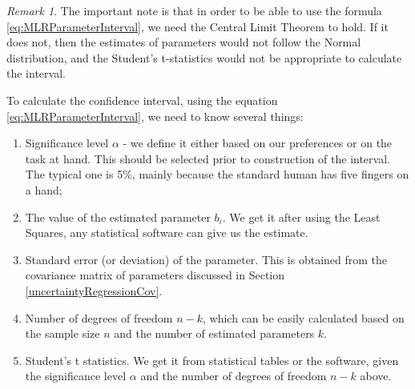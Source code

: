 \documentclass[
]{book}
\providecommand{\tightlist}{%
  \setlength{\itemsep}{0pt}\setlength{\parskip}{0pt}}
\theoremstyle{definition}
\theoremstyle{definition}
\theoremstyle{definition}
\theoremstyle{definition}
\theoremstyle{remark}
\newtheorem*{remark}{Remark}
\begin{document}
\begin{remark}
The important note is that in order to be able to use the formula \eqref{eq:MLRParameterInterval}, we need the Central Limit Theorem to hold. If it does not, then the estimates of parameters would not follow the Normal distribution, and the Student's t-statistics would not be appropriate to calculate the interval.
\end{remark}

To calculate the confidence interval, using the equation \eqref{eq:MLRParameterInterval}, we need to know several things:

\begin{enumerate}
\def\labelenumi{\arabic{enumi}.}
\tightlist
\item
  Significance level \(\alpha\) - we define it either based on our preferences or on the task at hand. This should be selected prior to construction of the interval. The typical one is 5\%, mainly because the standard human has five fingers on a hand;
\item
  The value of the estimated parameter \(b_i\). We get it after using the Least Squares, any statistical software can give us the estimate.
\item
  Standard error (or deviation) of the parameter. This is obtained from the covariance matrix of parameters discussed in Section \ref{uncertaintyRegressionCov}.
\item
  Number of degrees of freedom \(n-k\), which can be easily calculated based on the sample size \(n\) and the number of estimated parameters \(k\).
\item
  Student's t statistics. We get it from statistical tables or the software, given the significance level \(\alpha\) and the number of degrees of freedom \(n-k\) above.
\end{enumerate}
\end{document}
